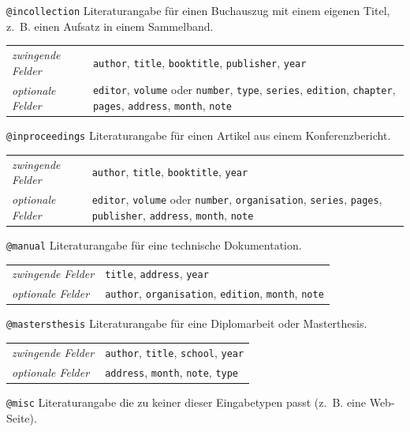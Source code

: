\documentclass[a4paper,10pt,twoside]{scrbook}
\begin{document}
{\verb!@incollection! Literaturangabe für einen 
Buchauszug mit einem eigenen Titel, z.~B. einen Aufsatz in einem Sammelband.

\begin{tabular}{p{2.8cm}p{10cm}}
	 \textsl{zwingende Felder} & \texttt{author}, \texttt{title}, \texttt{booktitle}, \texttt{publisher}, \texttt{year}\\
	 \textsl{optionale Felder} & \texttt{editor}, \texttt{volume} oder \texttt{number}, \texttt{type}, \texttt{series}, \texttt{edition}, \texttt{chapter}, \texttt{pages}, \texttt{address}, \texttt{month}, \texttt{note}\\
\end{tabular}

\verb!@inproceedings! Literaturangabe für einen 
Artikel aus einem Konferenzbericht.

\begin{tabular}{p{2.8cm}p{10cm}}
	 \textsl{zwingende Felder} & \texttt{author}, \texttt{title}, \texttt{booktitle}, \texttt{year}\\
	 \textsl{optionale Felder} & \texttt{editor}, \texttt{volume} oder \texttt{number}, \texttt{organisation}, \texttt{series}, \texttt{pages}, \texttt{publisher}, \texttt{address}, \texttt{month}, \texttt{note}\\
\end{tabular}

\verb!@manual! Literaturangabe für eine technische Dokumentation.

\begin{tabular}{p{2.8cm}p{10cm}}
	 \textsl{zwingende Felder} & \texttt{title}, \texttt{address}, \texttt{year} \\
	 \textsl{optionale Felder} & \texttt{author}, \texttt{organisation}, \texttt{edition}, \texttt{month}, \texttt{note}\\
\end{tabular}

\verb!@mastersthesis! Literaturangabe für eine Diplomarbeit oder Masterthesis.

\begin{tabular}{p{2.8cm}p{10cm}}
	 \textsl{zwingende Felder} & \texttt{author}, \texttt{title}, \texttt{school}, \texttt{year}\\
	 \textsl{optionale Felder} & \texttt{address}, \texttt{month}, \texttt{note}, \texttt{type}\\
\end{tabular}

\verb!@misc! Literaturangabe die zu keiner dieser Eingabetypen passt (z.~B. eine Web-Seite).

}
\end{document}

